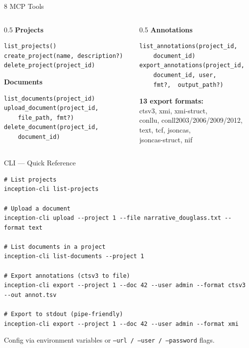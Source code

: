 \documentclass[aspectratio=169, 10pt]{beamer}
\begin{document}
\begin{frame}[fragile]{8 MCP Tools}

  \begin{columns}
    \begin{column}{0.5\textwidth}
      \textbf{Projects}
      \begin{lstlisting}
list_projects()
create_project(name, description?)
delete_project(project_id)
      \end{lstlisting}

      \textbf{Documents}
      \begin{lstlisting}
list_documents(project_id)
upload_document(project_id,
    file_path, fmt?)
delete_document(project_id,
    document_id)
      \end{lstlisting}
    \end{column}
    \begin{column}{0.5\textwidth}
      \textbf{Annotations}
      \begin{lstlisting}
list_annotations(project_id,
    document_id)
export_annotations(project_id,
    document_id, user,
    fmt?,  output_path?)
      \end{lstlisting}

      \smallskip
      \textbf{13 export formats:}\\
      \footnotesize
      ctsv3, xmi, xmi-struct,\\
      conllu, conll2003/2006/2009/2012,\\
      text, tcf, jsoncas,\\
      jsoncas-struct, nif
    \end{column}
  \end{columns}
\end{frame}

\begin{frame}[fragile]{CLI — Quick Reference}

\begin{lstlisting}[basicstyle=\ttfamily\scriptsize]
# List projects
inception-cli list-projects

# Upload a document
inception-cli upload --project 1 --file narrative_douglass.txt --format text

# List documents in a project
inception-cli list-documents --project 1

# Export annotations (ctsv3 to file)
inception-cli export --project 1 --doc 42 --user admin --format ctsv3 --out annot.tsv

# Export to stdout (pipe-friendly)
inception-cli export --project 1 --doc 42 --user admin --format xmi
\end{lstlisting}

  \bigskip
  Config via environment variables or \texttt{--url / --user / --password} flags.
\end{frame}
\end{document}
